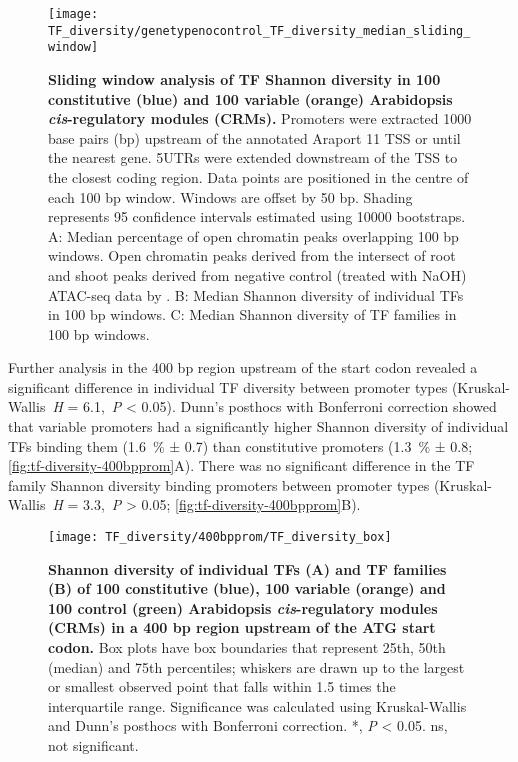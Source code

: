 \documentclass[../main.tex]{subfiles}
\begin{document}
 \begin{figure}[hbt!]
	\begin{center}
		\capstart
		\texttt{[image: TF\_diversity/genetypenocontrol\_TF\_diversity\_median\_sliding\_window]}
		\caption{
			\textbf{Sliding window analysis of TF Shannon diversity in 100 constitutive (blue) and 100 variable (orange) Arabidopsis \textit{cis}\hyp{}regulatory modules (CRMs).}
			Promoters were extracted 1000 base pairs (bp) upstream of the annotated Araport 11 \autocite{chengAraport11CompleteReannotation2017} TSS or until the nearest gene.
			5UTRs were extended downstream of the TSS to the closest coding region.
			Data points are positioned in the centre of each 100 bp window.
			Windows are offset by 50 bp.
			Shading represents 95 confidence intervals estimated using 10000 bootstraps.
			A: Median percentage of open chromatin peaks overlapping 100 bp windows. Open chromatin peaks derived from the intersect of root and shoot peaks derived from negative control (treated with NaOH) ATAC\hyp{}seq data by \textcite{potterCytokininModulatesContextdependent2018}.	
			B: Median Shannon diversity of individual TFs in 100 bp windows.
			C: Median Shannon diversity of TF families in 100 bp windows.
			\label{fig:tf-diversity-sliding-window}
		}
	\end{center}
\end{figure}

Further analysis in the 400 bp region upstream of the start codon revealed a significant difference in individual TF diversity between promoter types (Kruskal\hyp{}Wallis~\textit{H} = 6.1,~\textit{P} \textless{} 0.05).
Dunn's posthocs with Bonferroni correction showed that variable promoters had a significantly higher Shannon diversity of individual TFs binding them (\SI{1.6}{\percent} ± 0.7) than constitutive promoters (\SI{1.3}{\percent} ± 0.8; \autoref{fig:tf-diversity-400bpprom}A).
There was no significant difference in the TF family Shannon diversity binding promoters between promoter types (Kruskal\hyp{}Wallis~\textit{H} = 3.3,~\textit{P} \textgreater{} 0.05; \autoref{fig:tf-diversity-400bpprom}B).


\begin{figure}[hbt!]
	\begin{center}
		\capstart
		\texttt{[image: TF\_diversity/400bpprom/TF\_diversity\_box]}
		\caption{
			\textbf{Shannon diversity of individual TFs (A) and TF families (B) of 100 constitutive (blue), 100 variable (orange) and 100 control (green) Arabidopsis \textit{cis}\hyp{}regulatory modules (CRMs) in a 400 bp region upstream of the ATG start codon.}
			Box plots have box boundaries that represent 25th, 50th (median) and 75th percentiles; whiskers are drawn up to the largest or smallest observed point that falls within 1.5 times the interquartile range.
			\label{fig:tf-diversity-400bpprom}
			Significance was calculated using Kruskal\hyp{}Wallis and Dunn's posthocs with Bonferroni correction.
			*, \textit{P} \textless{} 0.05. ns, not significant.
		}
	\end{center}
\end{figure}
\end{document}
